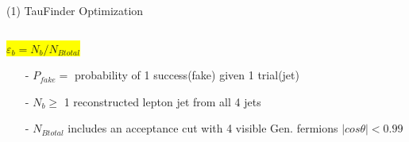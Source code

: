 \documentclass[10pt]{beamer}
\begin{document}
\begin{frame}{(1) TauFinder Optimization}
\begin{columns}
\begin{column}{0.5\textwidth}
\colorbox{yellow}{ $\varepsilon_b = N_b/N_{Btotal}$} \\
	\scriptsize
	\begin{itemize}
	\item[-] $P_{fake} =$ probability of 1 success(fake) given 1 trial(jet)\\
	\item[-] $N_b \geq$ 1 reconstructed lepton jet from all 4 jets\\
	\item[-] $N_{Btotal}$ includes an acceptance cut with 4 visible Gen. fermions $|cos\theta |< 0.99$
	\end{itemize}

\end{column}
\end{columns}

\end{frame}
\end{document}
